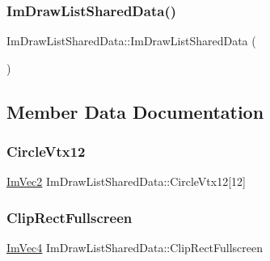 \subsubsection{\texorpdfstring{Im\+Draw\+List\+Shared\+Data()}{ImDrawListSharedData()}}
{\footnotesize\ttfamily Im\+Draw\+List\+Shared\+Data\+::\+Im\+Draw\+List\+Shared\+Data (\begin{DoxyParamCaption}{ }\end{DoxyParamCaption})}



\subsection{Member Data Documentation}
\hypertarget{struct_im_draw_list_shared_data_aca28baf42970650f5ee59c71dc905971}{}\label{struct_im_draw_list_shared_data_aca28baf42970650f5ee59c71dc905971} 
\subsubsection{\texorpdfstring{Circle\+Vtx12}{CircleVtx12}}
{\footnotesize\ttfamily \hyperlink{struct_im_vec2}{Im\+Vec2} Im\+Draw\+List\+Shared\+Data\+::\+Circle\+Vtx12\mbox{[}12\mbox{]}}

\hypertarget{struct_im_draw_list_shared_data_ac8737a7aae92c55d75998a6c9f6f3882}{}\label{struct_im_draw_list_shared_data_ac8737a7aae92c55d75998a6c9f6f3882} 
\subsubsection{\texorpdfstring{Clip\+Rect\+Fullscreen}{ClipRectFullscreen}}
{\footnotesize\ttfamily \hyperlink{struct_im_vec4}{Im\+Vec4} Im\+Draw\+List\+Shared\+Data\+::\+Clip\+Rect\+Fullscreen}

\hypertarget{struct_im_draw_list_shared_data_a5b5bb46f5fd714b43e4b73a131b7f6f7}{}\label{struct_im_draw_list_shared_data_a5b5bb46f5fd714b43e4b73a131b7f6f7} 
